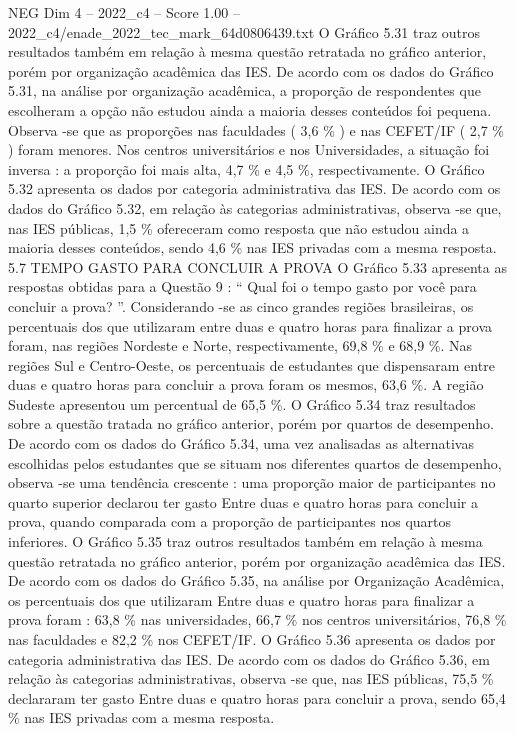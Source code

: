 \begin{textsample}{NEG Dim 4 – 2022\_c4 – Score 1.00 – 2022\_c4/enade\_2022\_tec\_mark\_64d0806439.txt}
O Gráfico 5.31 traz outros resultados também em relação à mesma questão retratada no gráfico anterior, porém por organização acadêmica das IES.
De acordo com os dados do Gráfico 5.31, na análise por organização acadêmica, a proporção de respondentes que escolheram a opção não estudou ainda a maioria desses conteúdos foi pequena.
Observa -se que as proporções nas faculdades ( 3,6 \% ) e nas CEFET/IF ( 2,7 \% ) foram menores.
Nos centros universitários e nos Universidades, a situação foi inversa : a proporção foi mais alta, 4,7 \% e 4,5 \%, respectivamente.
O Gráfico 5.32 apresenta os dados por categoria administrativa das IES.
De acordo com os dados do Gráfico 5.32, em relação às categorias administrativas, observa -se que, nas IES públicas, 1,5 \% ofereceram como resposta que não estudou ainda a maioria desses conteúdos, sendo 4,6 \% nas IES privadas com a mesma resposta. 5.7 TEMPO GASTO PARA CONCLUIR A PROVA O Gráfico 5.33 apresenta as respostas obtidas para a Questão 9 : “ Qual foi o tempo gasto por você para concluir a prova? ”.
Considerando -se as cinco grandes regiões brasileiras, os percentuais dos que utilizaram entre duas e quatro horas para finalizar a prova foram, nas regiões Nordeste e Norte, respectivamente, 69,8 \% e 68,9 \%.
Nas regiões Sul e Centro-Oeste, os percentuais de estudantes que dispensaram entre duas e quatro horas para concluir a prova foram os mesmos, 63,6 \%.
A região Sudeste apresentou um percentual de 65,5 \%.
O Gráfico 5.34 traz resultados sobre a questão tratada no gráfico anterior, porém por quartos de desempenho.
De acordo com os dados do Gráfico 5.34, uma vez analisadas as alternativas escolhidas pelos estudantes que se situam nos diferentes quartos de desempenho, observa -se uma tendência crescente : uma proporção maior de participantes no quarto superior declarou ter gasto Entre duas e quatro horas para concluir a prova, quando comparada com a proporção de participantes nos quartos inferiores.
O Gráfico 5.35 traz outros resultados também em relação à mesma questão retratada no gráfico anterior, porém por organização acadêmica das IES.
De acordo com os dados do Gráfico 5.35, na análise por Organização Acadêmica, os percentuais dos que utilizaram Entre duas e quatro horas para finalizar a prova foram : 63,8 \% nas universidades, 66,7 \% nos centros universitários, 76,8 \% nas faculdades e 82,2 \% nos CEFET/IF.
O Gráfico 5.36 apresenta os dados por categoria administrativa das IES.
De acordo com os dados do Gráfico 5.36, em relação às categorias administrativas, observa -se que, nas IES públicas, 75,5 \% declararam ter gasto Entre duas e quatro horas para concluir a prova, sendo 65,4 \% nas IES privadas com a mesma resposta.

\end{textsample}
